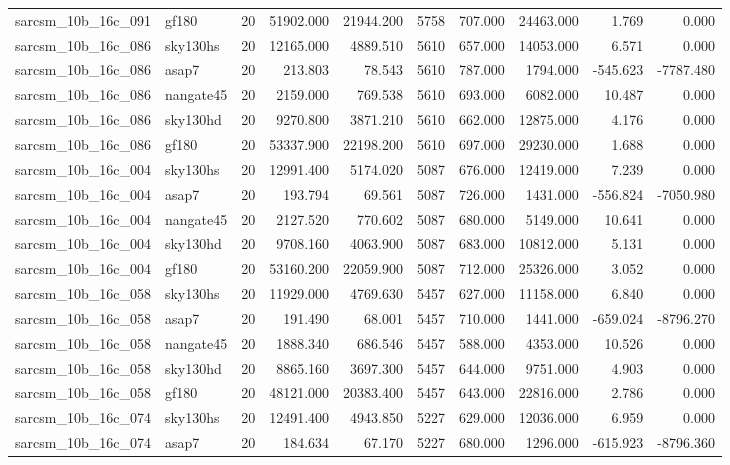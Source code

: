 \begin{tabular}{llrrrrrrrr}
sarcsm\_10b\_16c\_091 & gf180 & 20 & 51902.000 & 21944.200 & 5758 & 707.000 & 24463.000 & 1.769 & 0.000 \\
sarcsm\_10b\_16c\_086 & sky130hs & 20 & 12165.000 & 4889.510 & 5610 & 657.000 & 14053.000 & 6.571 & 0.000 \\
sarcsm\_10b\_16c\_086 & asap7 & 20 & 213.803 & 78.543 & 5610 & 787.000 & 1794.000 & -545.623 & -7787.480 \\
sarcsm\_10b\_16c\_086 & nangate45 & 20 & 2159.000 & 769.538 & 5610 & 693.000 & 6082.000 & 10.487 & 0.000 \\
sarcsm\_10b\_16c\_086 & sky130hd & 20 & 9270.800 & 3871.210 & 5610 & 662.000 & 12875.000 & 4.176 & 0.000 \\
sarcsm\_10b\_16c\_086 & gf180 & 20 & 53337.900 & 22198.200 & 5610 & 697.000 & 29230.000 & 1.688 & 0.000 \\
sarcsm\_10b\_16c\_004 & sky130hs & 20 & 12991.400 & 5174.020 & 5087 & 676.000 & 12419.000 & 7.239 & 0.000 \\
sarcsm\_10b\_16c\_004 & asap7 & 20 & 193.794 & 69.561 & 5087 & 726.000 & 1431.000 & -556.824 & -7050.980 \\
sarcsm\_10b\_16c\_004 & nangate45 & 20 & 2127.520 & 770.602 & 5087 & 680.000 & 5149.000 & 10.641 & 0.000 \\
sarcsm\_10b\_16c\_004 & sky130hd & 20 & 9708.160 & 4063.900 & 5087 & 683.000 & 10812.000 & 5.131 & 0.000 \\
sarcsm\_10b\_16c\_004 & gf180 & 20 & 53160.200 & 22059.900 & 5087 & 712.000 & 25326.000 & 3.052 & 0.000 \\
sarcsm\_10b\_16c\_058 & sky130hs & 20 & 11929.000 & 4769.630 & 5457 & 627.000 & 11158.000 & 6.840 & 0.000 \\
sarcsm\_10b\_16c\_058 & asap7 & 20 & 191.490 & 68.001 & 5457 & 710.000 & 1441.000 & -659.024 & -8796.270 \\
sarcsm\_10b\_16c\_058 & nangate45 & 20 & 1888.340 & 686.546 & 5457 & 588.000 & 4353.000 & 10.526 & 0.000 \\
sarcsm\_10b\_16c\_058 & sky130hd & 20 & 8865.160 & 3697.300 & 5457 & 644.000 & 9751.000 & 4.903 & 0.000 \\
sarcsm\_10b\_16c\_058 & gf180 & 20 & 48121.000 & 20383.400 & 5457 & 643.000 & 22816.000 & 2.786 & 0.000 \\
sarcsm\_10b\_16c\_074 & sky130hs & 20 & 12491.400 & 4943.850 & 5227 & 629.000 & 12036.000 & 6.959 & 0.000 \\
sarcsm\_10b\_16c\_074 & asap7 & 20 & 184.634 & 67.170 & 5227 & 680.000 & 1296.000 & -615.923 & -8796.360 \\

\end{tabular}
